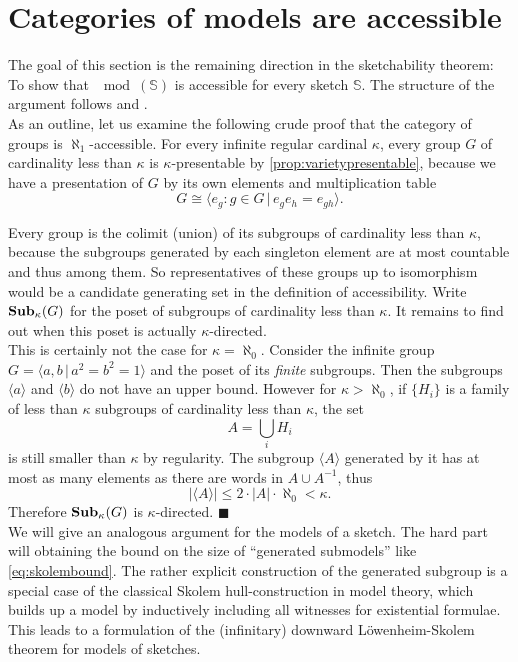 \section{Categories of models are accessible}
\label{sec:sketchesaccessible}

The goal of this section is the remaining direction in the sketchability theorem: To show that $\mod(\mathbb S)$ is accessible for every sketch $\mathbb S$. The structure of the argument follows \cite[\nopp~3.3.5]{MakkaiPare} and \cite[\nopp~D2.3.11]{elephant}. \\

As an outline, let us examine the following crude proof that the category of groups is $\aleph_1$-accessible. For every infinite regular cardinal $\kappa$, every group $G$ of cardinality less than $\kappa$ is $\kappa$-presentable by \ref{prop:varietypresentable}, because we have a presentation of $G$ by its own elements and multiplication table
\[ G \cong \langle e_g : g \in G \,|\, e_g e_h = e_{gh} \rangle. \]

Every group is the colimit (union) of its subgroups of cardinality less than $\kappa$, because the subgroups generated by each singleton element are at most countable and thus among them. So representatives of these groups up to isomorphism would be a candidate generating set in the definition of accessibility. Write $\mathbf{Sub}_\kappa(G)$ for the poset of subgroups of cardinality less than $\kappa$. It remains to find out when this poset is actually $\kappa$-directed. \\

This is certainly not the case for $\kappa=\aleph_0$. Consider the infinite group $G=\langle a, b \,|\, a^2 = b^2 = 1 \rangle$ and the poset of its \emph{finite} subgroups. Then the subgroups $\langle a \rangle$ and $\langle b \rangle$ do not have an upper bound. 
However for $\kappa > \aleph_0$, if $\{H_i\}$ is a family of less than $\kappa$ subgroups of cardinality less than $\kappa$, the set \[ A = \bigcup_i H_i \]
is still smaller than $\kappa$ by regularity. The subgroup $\langle A \rangle$ generated by it has at most as many elements as there are words in $A \cup A^{-1}$, thus
\begin{equation} |\langle A \rangle| \leq 2 \cdot |A|\cdot \aleph_0 < \kappa. \label{eq:skolembound} \end{equation}
Therefore $\mathbf{Sub}_\kappa(G)$ is $\kappa$-directed. $\blacksquare$ \\

We will give an analogous argument for the models of a sketch. The hard part will obtaining the bound on the size of ``generated submodels'' like \eqref{eq:skolembound}. The rather explicit construction of the generated subgroup is a special case of the classical Skolem hull-construction in model theory, which builds up a model by inductively including all witnesses for existential formulae. This leads to a formulation of the (infinitary) downward Löwenheim-Skolem theorem for models of sketches. \\

